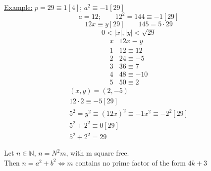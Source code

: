 \documentclass{report}
\begin{document}
\underline{Example:} $p=29 \equiv 1[4]$; $a^2\equiv-1[29]$
															\[a=12;\qquad 12^2=144\equiv -1[29]\]
															\[12x\equiv y[29]\qquad 145=5\cdot 29\]
															\[0<|x|,|y|<\sqrt{29}\]
															\[\begin{array}{r|cl}
																			x&12x\equiv y\\
																			\hline
																		1&12\equiv 12\\
																		2&24\equiv -5\\
																		3&36\equiv 7\\
																		4&48\equiv -10\\
																		5&50\equiv 2
															\end{array}\]
															\[\begin{array}{lcl}
																(x,y)=(2,-5)\\
																12\cdot 2\equiv -5[29]\\
																5^2=y^2\equiv (12x)^2\equiv -1x^2\equiv -2^2[29]\\
																5^2+2^2\equiv 0[29]\\
																5^2+2^2=29
																\end{array}
															\]
\begin{thm} Let $n\in \mathbb{N}$, $n=N^2m$, with m square free.\\
						Then $n=a^2+b^2 \iff m$ contains no prime factor of the form $4k+3$
\end{thm}
\end{document}
